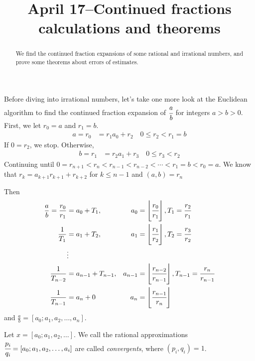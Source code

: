 \documentclass{ximera}
\title{April 17--Continued fractions calculations and theorems}
\begin{document}
  
\begin{abstract}  We find the continued fraction expansions of some rational and irrational numbers, and prove some theorems about errors of estimates.
\end{abstract}  
\maketitle  

Before diving into irrational numbers, let's take one more look at the Euclidean algorithm to find the continued fraction expansion of $\cfrac{a}{b}$ for integers $a>b>0$. First, we let $r_0=a$ and $r_1=b$.
\begin{align*}
 a=r_0&=r_1a_0+r_2\quad 0\leq r_2<r_1=b
\end{align*}
If $0=r_2$, we stop. Otherwise,
\begin{align*}
 b=r_1&=r_2a_1+r_3\quad 0\leq r_3<r_2
\end{align*}
Continuing until $0=r_{n+1}<r_n<r_{n-1}<r_{n-2}<\cdots<r_1=b<r_0=a$. We know that $r_{k}=a_{k+1}r_{k+1}+r_{k+2}$ for $k\leq n-1$ and $(a,b)=r_n$

Then 
\begin{align*}
 \frac{a}{b}=\frac{r_0}{r_1}&=a_0+T_1, 		&a_0&=\left\lfloor\cfrac{r_0}{r_1}\right\rfloor, T_1=\cfrac{r_2}{r_1}\\
 \frac{1}{T_1}&=a_1+T_2, 					& a_1&=\left\lfloor\cfrac{r_1}{r_2}\right\rfloor, T_2=\cfrac{r_3}{r_2}\\
 &\vdots\\
  \frac{1}{T_{n-2}}&=a_{n-1}+T_{n-1}, 		& a_{n-1}&=\left\lfloor\cfrac{r_{n-2}}{r_{n-1}}\right\rfloor, T_{n-1}=\cfrac{r_n}{r_{n-1}}\\
  \frac{1}{T_{n-1}}&=a_n+0				& a_{n}&=\left\lfloor\cfrac{r_{n-1}}{r_{n}}\right\rfloor 
  \end{align*}
 and $\frac{a}{b}=[a_0;a_1,a_2,\dots,a_n]$.
 
\begin{definition}
 Let $x=[a_0;a_1,a_2,\dots]$. We call the rational approximations $\cfrac{p_i}{q_i}=[a_0;a_1,a_2,\dots,a_i]$ are called \emph{convergents}, where $(p_i,q_i)=1$.
\end{definition}
\end{document}
